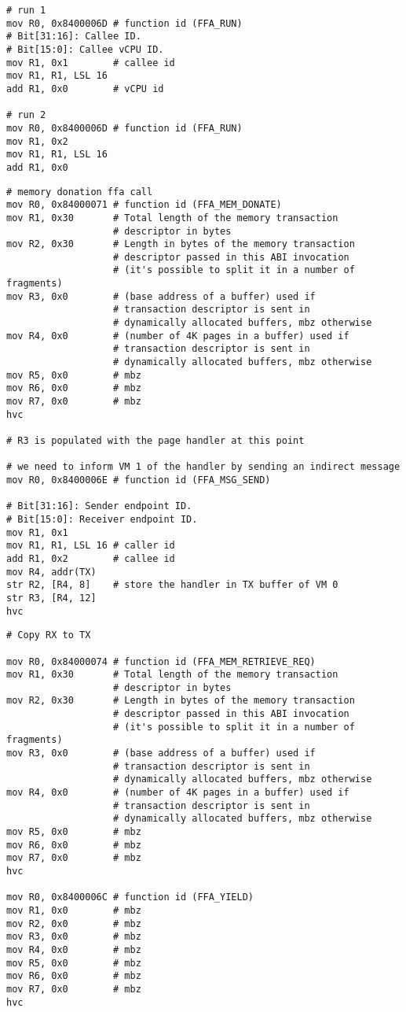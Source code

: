 \documentclass{article}
\begin{document}
\begin{lstlisting}[caption={VM 0}]
# run 1
mov R0, 0x8400006D # function id (FFA_RUN)
# Bit[31:16]: Callee ID.
# Bit[15:0]: Callee vCPU ID.
mov R1, 0x1        # callee id
mov R1, R1, LSL 16
add R1, 0x0        # vCPU id

# run 2
mov R0, 0x8400006D # function id (FFA_RUN)
mov R1, 0x2
mov R1, R1, LSL 16
add R1, 0x0
\end{lstlisting}

\begin{lstlisting}[caption={VM 1}]
# memory donation ffa call
mov R0, 0x84000071 # function id (FFA_MEM_DONATE)
mov R1, 0x30       # Total length of the memory transaction 
                   # descriptor in bytes
mov R2, 0x30       # Length in bytes of the memory transaction 
                   # descriptor passed in this ABI invocation
                   # (it's possible to split it in a number of fragments)
mov R3, 0x0        # (base address of a buffer) used if 
                   # transaction descriptor is sent in 
                   # dynamically allocated buffers, mbz otherwise
mov R4, 0x0        # (number of 4K pages in a buffer) used if 
                   # transaction descriptor is sent in 
                   # dynamically allocated buffers, mbz otherwise
mov R5, 0x0        # mbz
mov R6, 0x0        # mbz
mov R7, 0x0        # mbz
hvc

# R3 is populated with the page handler at this point

# we need to inform VM 1 of the handler by sending an indirect message
mov R0, 0x8400006E # function id (FFA_MSG_SEND)

# Bit[31:16]: Sender endpoint ID.
# Bit[15:0]: Receiver endpoint ID.
mov R1, 0x1
mov R1, R1, LSL 16 # caller id
add R1, 0x2        # callee id
mov R4, addr(TX)
str R2, [R4, 8]    # store the handler in TX buffer of VM 0
str R3, [R4, 12]
hvc
\end{lstlisting}

\begin{lstlisting}[caption={VM 2}]
# Copy RX to TX

mov R0, 0x84000074 # function id (FFA_MEM_RETRIEVE_REQ)
mov R1, 0x30       # Total length of the memory transaction 
                   # descriptor in bytes
mov R2, 0x30       # Length in bytes of the memory transaction 
                   # descriptor passed in this ABI invocation
                   # (it's possible to split it in a number of fragments)
mov R3, 0x0        # (base address of a buffer) used if 
                   # transaction descriptor is sent in 
                   # dynamically allocated buffers, mbz otherwise
mov R4, 0x0        # (number of 4K pages in a buffer) used if 
                   # transaction descriptor is sent in 
                   # dynamically allocated buffers, mbz otherwise
mov R5, 0x0        # mbz
mov R6, 0x0        # mbz
mov R7, 0x0        # mbz
hvc

mov R0, 0x8400006C # function id (FFA_YIELD)
mov R1, 0x0        # mbz
mov R2, 0x0        # mbz
mov R3, 0x0        # mbz
mov R4, 0x0        # mbz
mov R5, 0x0        # mbz
mov R6, 0x0        # mbz
mov R7, 0x0        # mbz
hvc
\end{lstlisting}
\end{document}
